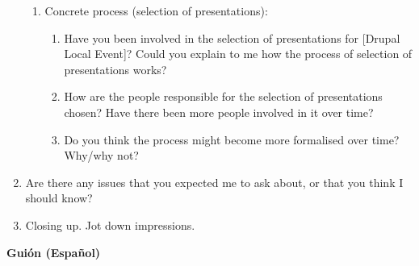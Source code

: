 \begin{enumerate}
\begin{enumerate}
			\item Concrete process (selection of presentations):
			\begin{enumerate}			
				\item Have you been involved in the selection of presentations for [Drupal Local Event]?  Could you explain to me how the process of selection of presentations works? 
				\item How are the people responsible for the selection of presentations chosen? Have there been more people involved in it over time?
				\item Do you think the process might become more formalised over time? Why/why not?
			\end{enumerate}	
		\end{enumerate}	
	\item Are there any issues that you expected me to ask about, or that you think I should know?
	\item Closing up. Jot down impressions.
\end{enumerate}

\newpage

\hrulefill\par


\begin{center}
\textbf{Guión (Español)}
\end{center}

